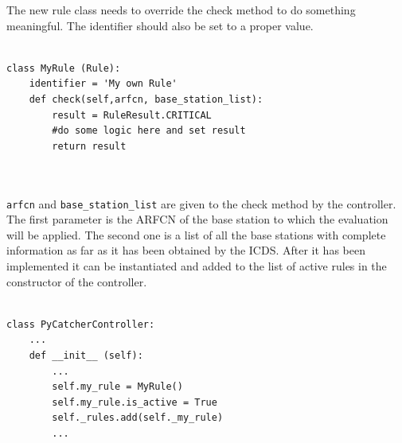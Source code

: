 The new rule class needs to override the check method to do something meaningful.
The identifier should also be set to a proper value.\\\\
\hspace*{\dimexpr\fboxsep+\fboxrule}%
\begin{minipage}{\dimexpr\textwidth-4\fboxsep-2\fboxrule} 
\begin{lstlisting}
class MyRule (Rule):
    identifier = 'My own Rule'
    def check(self,arfcn, base_station_list):
        result = RuleResult.CRITICAL
        #do some logic here and set result 
        return result
\end{lstlisting}
\end{minipage}\\\\
\texttt{arfcn} and \texttt{base\_station\_list} are given to the check method by the controller.
The first parameter is the ARFCN of the base station to which the evaluation will be applied.
The second one is a list of all the base stations with complete information as far as it has been
obtained by the ICDS.
After it has been implemented it can be instantiated and added to the list of active rules in the 
constructor of the controller.\\\\
\hspace*{\dimexpr\fboxsep+\fboxrule}%
\begin{minipage}{\dimexpr\textwidth-4\fboxsep-2\fboxrule} 
\begin{lstlisting}
class PyCatcherController:
    ...
    def __init__ (self):
        ...
        self.my_rule = MyRule()
        self.my_rule.is_active = True
        self._rules.add(self._my_rule)
        ...
\end{lstlisting}
\end{minipage}
\newpage

